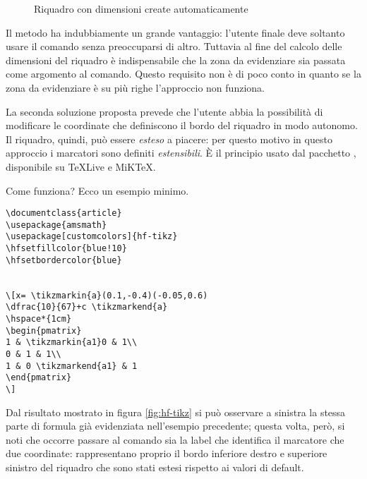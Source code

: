 \begin{figure}[ht]
\centering
{}
\caption{Riquadro con dimensioni create automaticamente}
\label{fig:peter}
\end{figure}
Il metodo ha indubbiamente un grande vantaggio: l'utente finale deve soltanto usare il comando  senza preoccuparsi di altro. Tuttavia al fine del calcolo delle dimensioni del riquadro è indispensabile che la zona da evidenziare sia passata come argomento al comando. Questo requisito non è di poco conto in quanto se la zona da evidenziare è su più righe l'approccio non funziona.

La seconda soluzione proposta prevede che l'utente abbia la possibilità di modificare le coordinate che definiscono il bordo del riquadro in modo autonomo. Il riquadro, quindi, può essere \emph{esteso} a piacere: per questo motivo in questo approccio i marcatori sono definiti \emph{estensibili}. È il principio usato dal pacchetto , disponibile su \TeX Live e MiK\TeX{}.

Come funziona? Ecco un esempio minimo.
\begin{lstlisting}[frame=lines]
\documentclass{article}
\usepackage{amsmath}
\usepackage[customcolors]{hf-tikz}
\hfsetfillcolor{blue!10}
\hfsetbordercolor{blue}


\[x= \tikzmarkin{a}(0.1,-0.4)(-0.05,0.6) 
\dfrac{10}{67}+c \tikzmarkend{a} 
\hspace*{1cm}
\begin{pmatrix}
1 & \tikzmarkin{a1}0 & 1\\
0 & 1 & 1\\
1 & 0 \tikzmarkend{a1} & 1
\end{pmatrix}
\]

\end{lstlisting}

Dal risultato mostrato in figura \ref{fig:hf-tikz} si può osservare a sinistra la stessa parte di formula già evidenziata nell'esempio precedente; questa volta, però, si noti che occorre passare al comando  sia la label che identifica il marcatore che due coordinate: rappresentano proprio il bordo inferiore destro e superiore sinistro del riquadro che sono stati estesi rispetto ai valori di default.

